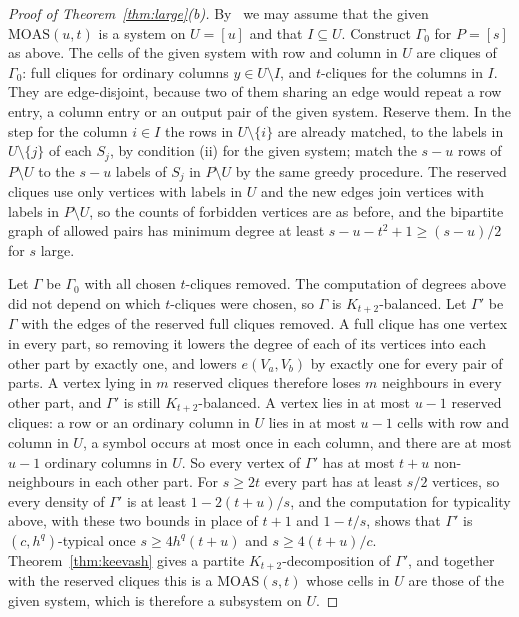 \documentclass[11pt]{amsart}
\theoremstyle{definition}\newtheorem{definition}[theorem]{Definition}
\theoremstyle{remark}\newtheorem{remark}[theorem]{Remark}
\newcommand{\MOAS}{\mathrm{MOAS}}
\begin{document}
\begin{proof}[Proof of Theorem~\ref{thm:large}(b)]
By~\cite[Lemma~2.19]{ABW} we may assume that the given $\MOAS(u,t)$ is a system on $U=[u]$ and that $I\subseteq U$. Construct $\Gamma_0$ for
$P=[s]$ as above. The cells of the given system with row and column in $U$ are cliques of $\Gamma_0$: full cliques for
ordinary columns $y\in U\setminus I$, and $t$-cliques for the columns in $I$. They are edge-disjoint, because two of
them sharing an edge would repeat a row entry, a column entry or an output pair of the given system. Reserve them. In
the step for the column $i\in I$ the rows in $U\setminus\{i\}$ are already matched, to the labels in
$U\setminus\{j\}$ of each $S_j$, by condition (ii) for the given system; match the $s-u$ rows of $P\setminus U$ to the
$s-u$ labels of $S_j$ in $P\setminus U$ by the same greedy procedure. The reserved cliques use only vertices with
labels in $U$ and the new edges join vertices with labels in $P\setminus U$, so the counts of forbidden vertices are
as before, and the bipartite graph of allowed pairs has minimum degree at least $s-u-t^2+1\ge(s-u)/2$ for $s$ large.

Let $\Gamma$ be $\Gamma_0$ with all chosen $t$-cliques removed. The computation of degrees above did not depend on which
$t$-cliques were chosen, so $\Gamma$ is $K_{t+2}$-balanced. Let $\Gamma'$ be $\Gamma$ with the edges of the reserved full
cliques removed. A full clique has one vertex in every part, so removing it lowers the degree of each of its vertices
into each other part by exactly one, and lowers $e(V_a,V_b)$ by exactly one for every pair of parts. A vertex lying in
$m$ reserved cliques therefore loses $m$ neighbours in every other part, and $\Gamma'$ is still $K_{t+2}$-balanced. A
vertex lies in at most $u-1$ reserved cliques: a row or an ordinary column in $U$ lies in at most $u-1$ cells with row
and column in $U$, a symbol occurs at most once in each column, and there are at most $u-1$ ordinary columns in $U$.
So every vertex of $\Gamma'$ has at most $t+u$ non-neighbours in each other part. For $s\ge2t$ every part has at least
$s/2$ vertices, so every density of $\Gamma'$ is at least $1-2(t+u)/s$, and the computation for typicality above, with
these two bounds in place of $t+1$ and $1-t/s$, shows that $\Gamma'$ is $(c,h^q)$-typical once $s\ge4h^q(t+u)$ and
$s\ge4(t+u)/c$. Theorem~\ref{thm:keevash} gives a partite
$K_{t+2}$-decomposition of $\Gamma'$, and together with the reserved cliques this is a $\MOAS(s,t)$ whose cells in $U$
are those of the given system, which is therefore a subsystem on $U$.
\end{proof}
\end{document}
